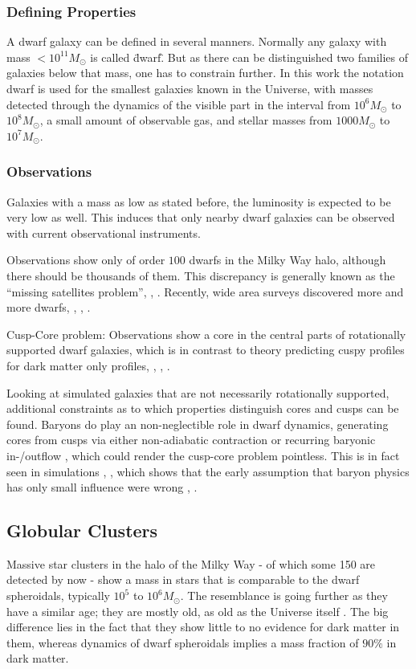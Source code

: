 \documentclass[useAMS,usenatbib]{mn2e}
\begin{document}
\subsubsection{Defining Properties}
A dwarf galaxy can be defined in several manners. Normally any galaxy
with mass $<10^{11}M_\odot$ is called \"dwarf\". But as there can be
distinguished two families of galaxies below that mass, one has to
constrain further. In this work the notation dwarf is used for the
smallest galaxies known in the Universe, with masses detected through
the dynamics of the visible part in the interval from $10^6M_\odot$ to
$10^8M_\odot$, a small amount of observable gas, and stellar masses
from $1000M_\odot$ to $10^7M_\odot$.
%
\subsubsection{Observations}
Galaxies with a mass as low as stated before, the luminosity is
expected to be very low as well. This induces that only nearby dwarf
galaxies can be observed with current observational instruments.

Observations show only of order $100$ dwarfs in the Milky Way halo,
although there should be thousands of them. This discrepancy is
generally known as the ``missing satellites problem'',
\citep{Moore1999}, \citep{Klypin1999}. Recently, wide area surveys
discovered more and more dwarfs, \citep{Belokurov2007},
\citep{Belokurov2009}, \citep{Belokurov2010}.

Cusp-Core problem: Observations show a core in the central parts of
rotationally supported dwarf galaxies, which is in contrast to theory
predicting cuspy profiles for dark matter only profiles,
\citep{Moore1994}, \citep{Flores1994}, \citep{Moore1999a}.

Looking at simulated galaxies that are not necessarily rotationally
supported, additional constraints as to which properties distinguish
cores and cusps can be found. Baryons do play an non-neglectible role
in dwarf dynamics, generating cores from cusps via either
non-adiabatic contraction or recurring baryonic in-/outflow
\citep{Read2005}, which could render the cusp-core problem
pointless. This is in fact seen in simulations \citep{Mashchenko2008},
\citep{Governato2009}, which shows that the early assumption that
baryon physics has only small influence were wrong
\citep{Navarro1996}, \citep{Gnedin2002}.

\subsection{Globular Clusters}
Massive star clusters in the halo of the Milky Way - of which some 150
are detected by now \cite{TODO} - show a mass in stars that is
comparable to the dwarf spheroidals, typically $10^5$ to
$10^6M_\odot$. The resemblance is going further as they have a similar
age; they are mostly old, as old as the Universe itself
\cite{TODO}. The big difference lies in the fact that they show little
to no evidence for dark matter in them, whereas dynamics of dwarf
spheroidals implies a mass fraction of $90\%$ in dark matter.
\end{document}
